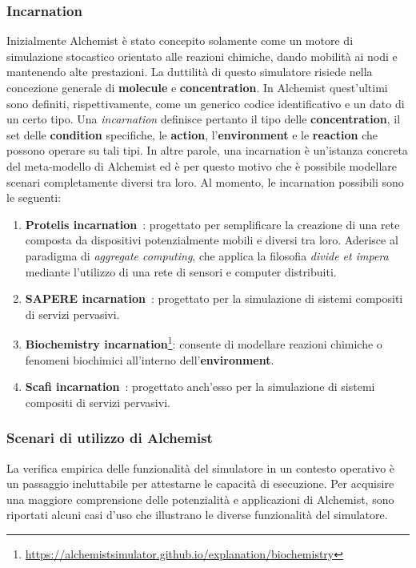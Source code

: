 \subsubsection{Incarnation}
Inizialmente Alchemist è stato concepito solamente come un motore di simulazione stocastico orientato alle reazioni chimiche, dando mobilità ai nodi e mantenendo alte prestazioni. 
La duttilità di questo simulatore risiede nella concezione generale di \textbf{molecule} e \textbf{concentration}. In Alchemist quest'ultimi sono definiti, rispettivamente, come un generico codice identificativo e un dato di un certo tipo. Una \textit{incarnation} definisce pertanto il tipo delle \textbf{concentration}, il set delle \textbf{condition} specifiche, le \textbf{action}, l'\textbf{environment} e le \textbf{reaction} che possono operare su tali tipi.
In altre parole, una incarnation è un'istanza concreta del meta-modello di Alchemist ed è per questo motivo che è possibile modellare scenari completamente diversi tra loro.
Al momento, le incarnation possibili sono le seguenti:
\begin{enumerate}
	\item \textbf{Protelis incarnation}~\cite{Pianini2015}:  progettato per semplificare la creazione di una rete composta da dispositivi potenzialmente mobili e diversi tra loro. Aderisce al paradigma di \textit{aggregate computing}, che applica la filosofia \textit{divide et impera} mediante l'utilizzo di una rete di sensori e computer distribuiti.
	\item \textbf{SAPERE incarnation}~\cite{Zambonelli2015}: progettato per la simulazione di sistemi compositi di servizi pervasivi.
	\item \textbf{Biochemistry incarnation}\footnote{\url{https://alchemistsimulator.github.io/explanation/biochemistry}}: consente di modellare reazioni chimiche o fenomeni biochimici all'interno dell'\textbf{environment}.
	\item \textbf{Scafi incarnation}~\cite{Casadei2022}:  progettato anch'esso per la simulazione di sistemi compositi di servizi pervasivi.
\end{enumerate}

\subsubsection{Scenari di utilizzo di Alchemist}
La verifica empirica delle funzionalità del simulatore in un contesto operativo è un passaggio ineluttabile per attestarne le capacità di esecuzione. Per acquisire una maggiore comprensione delle potenzialità e applicazioni di Alchemist, sono riportati alcuni casi d'uso che illustrano le diverse funzionalità del simulatore.

